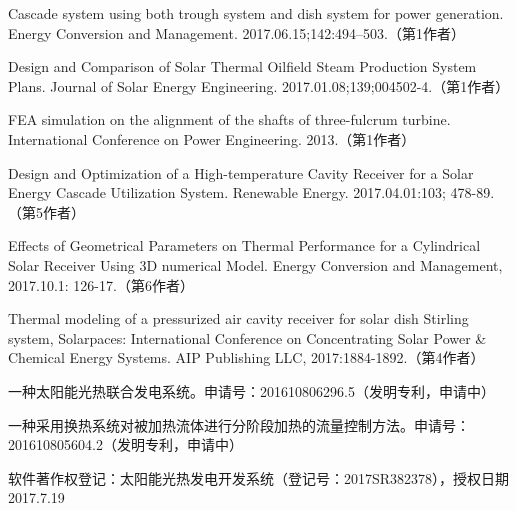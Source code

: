 \begin{publications}
  \item Cascade system using both trough system and dish system for power generation. Energy Conversion and Management. 2017.06.15;142:494–503.（第1作者）
  \item Design and Comparison of Solar Thermal Oilfield Steam Production System Plans. Journal of Solar Energy Engineering. 2017.01.08;139;004502-4.（第1作者）
  \item FEA simulation on the alignment of the shafts of three-fulcrum turbine. International Conference on Power Engineering. 2013.（第1作者）
  \item Design and Optimization of a High-temperature Cavity Receiver for a Solar Energy Cascade Utilization System. Renewable Energy. 2017.04.01:103; 478-89. （第5作者）
  \item Effects of Geometrical Parameters on Thermal Performance for a Cylindrical Solar Receiver Using 3D numerical Model. Energy Conversion and Management, 2017.10.1: 126-17.（第6作者）
  \item Thermal modeling of a pressurized air cavity receiver for solar dish Stirling system, Solarpaces: International Conference on Concentrating Solar Power \& Chemical Energy Systems. AIP Publishing LLC, 2017:1884-1892.（第4作者）
  
  \item 一种太阳能光热联合发电系统。申请号：201610806296.5（发明专利，申请中）
  \item 一种采用换热系统对被加热流体进行分阶段加热的流量控制方法。申请号：201610805604.2（发明专利，申请中）
  \item 软件著作权登记：太阳能光热发电开发系统（登记号：2017SR382378），授权日期2017.7.19
  
\end{publications}